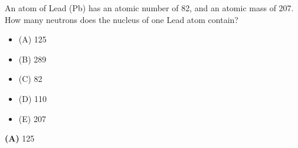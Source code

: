 

An atom of Lead (Pb) has an atomic number of 82, and an atomic mass of 207.  How many neutrons does the nucleus of one Lead atom contain?

\begin{itemize}
\item{(A)} 125
\vskip 5pt 
\item{(B)} 289
\vskip 5pt 
\item{(C)} 82
\vskip 5pt 
\item{(D)} 110
\vskip 5pt 
\item{(E)} 207
\end{itemize}







{\bf (A)} 125
 










